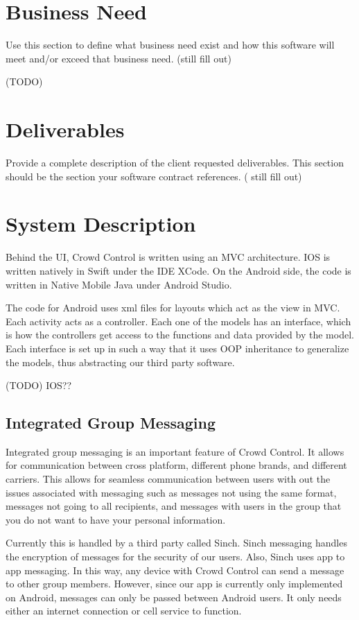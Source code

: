 \section{Business Need}
Use this section to define what business need exist and how this software will 
meet and/or exceed that business need.   (still fill out)

(TODO)

\section{Deliverables}

Provide a complete description of the client requested deliverables.   This section should be the section your software contract references.   ( still fill out)

\section{System Description}
Behind the UI, Crowd Control is written using an MVC architecture. IOS is written natively in Swift under the IDE XCode. On the Android side, the code is written in Native Mobile Java under Android Studio.

The code for Android uses xml files for layouts which act as the view in MVC. Each activity acts as a controller. Each one of the models has an interface, which is how the controllers get access to the functions and data provided by the model. Each interface is set up in such a way that it uses OOP inheritance to generalize the models, thus abstracting our third party software.

(TODO) IOS??

\subsection{Integrated Group Messaging}
Integrated group messaging is an important feature of Crowd Control. It allows for communication between cross platform, different phone brands, and different carriers. This allows for seamless communication between users with out the issues associated with messaging such as messages not using the same format, messages not going to all recipients, and messages with users in the group that you do not want to have your personal information.

Currently this is handled by a third party called Sinch. Sinch messaging handles the encryption of messages for the security of our users. Also, Sinch uses app to app messaging. In this way, any device with Crowd Control can send a message to other group members. However, since our app is currently only implemented on Android, messages can only be passed between Android users. It only needs either an internet connection or cell service to function.

